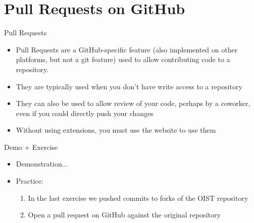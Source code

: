 \documentclass{beamer}
\begin{document}


\section{Pull Requests on GitHub}
\begin{frame}{Pull Requests}
  \begin{itemize}
    \item Pull Requests are a GitHub-specific feature (also implemented on other platforms, but not a git feature) used to allow contributing code to a repository.
    \item They are typically used when you don\rq{}t have write access to a repository
    \item They can also be used to allow review of your code, perhaps by a coworker, even if you could directly push your changes
    \item Without using extensions, you must use the website to use them
  \end{itemize}
\end{frame}

\begin{frame}
  \begin{block}{Demo + Exercise}
    \begin{itemize}
      \item Demonstration...
      \item Practice:
      \begin{enumerate}
        \item In the last exercise we pushed commits to forks of the OIST repository
        \item Open a pull request on GitHub against the original repository
      \end{enumerate}
    \end{itemize}
  \end{block}
\end{frame}
\end{document}
